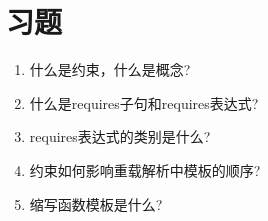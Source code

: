 \section{习题}
\begin{enumerate}
\item
什么是约束，什么是概念?

\item
什么是requires子句和requires表达式?

\item
requires表达式的类别是什么?

\item
约束如何影响重载解析中模板的顺序?

\item
缩写函数模板是什么?
\end{enumerate}